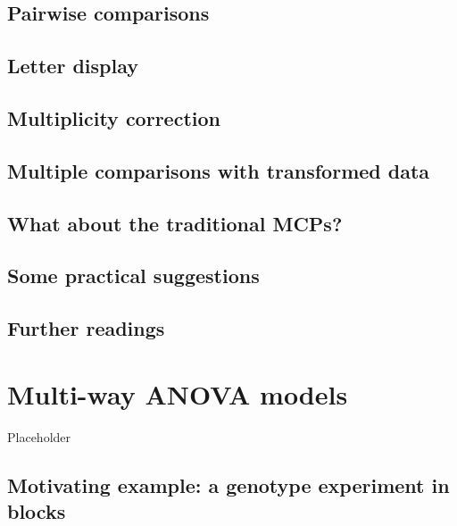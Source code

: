 \documentclass[a4paper,12pt,oneside]{book}
\begin{document}
\hypertarget{pairwise-comparisons}{%
\section{Pairwise comparisons}\label{pairwise-comparisons}}

\hypertarget{letter-display}{%
\section{Letter display}\label{letter-display}}

\hypertarget{multiplicity-correction}{%
\section{Multiplicity correction}\label{multiplicity-correction}}

\hypertarget{multiple-comparisons-with-transformed-data}{%
\section{Multiple comparisons with transformed data}\label{multiple-comparisons-with-transformed-data}}

\hypertarget{what-about-the-traditional-mcps}{%
\section{What about the traditional MCPs?}\label{what-about-the-traditional-mcps}}

\hypertarget{some-practical-suggestions}{%
\section{Some practical suggestions}\label{some-practical-suggestions}}

\hypertarget{further-readings-7}{%
\section{Further readings}\label{further-readings-7}}

\hypertarget{multi-way-anova-models}{%
\chapter{Multi-way ANOVA models}\label{multi-way-anova-models}}

Placeholder

\hypertarget{motivating-example-a-genotype-experiment-in-blocks}{%
\section{Motivating example: a genotype experiment in blocks}\label{motivating-example-a-genotype-experiment-in-blocks}}
\end{document}
